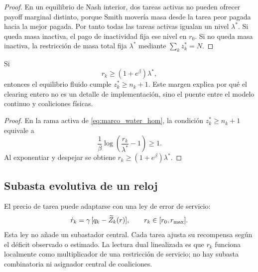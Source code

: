 \begin{proof}
En un equilibrio de Nash interior, dos tareas activas no pueden ofrecer payoff marginal
distinto, porque Smith movería masa desde la tarea peor pagada hacia la mejor pagada.
Por tanto todas las tareas activas igualan un nivel $\lambda^*$. Si queda masa inactiva,
el pago de inactividad fija ese nivel en $r_0$. Si no queda masa inactiva, la restricción
de masa total fija $\lambda^*$ mediante $\sum_k z_k^*=N$.
\end{proof}

\begin{corolario}
Si
\[
  r_k\ge (1+e^\beta)\lambda^*,
\]
entonces el equilibrio fluido cumple $z_k^*\ge n_k+1$. Este margen explica por qué el
clearing entero no es un detalle de implementación, sino el puente entre el modelo
continuo y coaliciones físicas.
\end{corolario}

\begin{proof}
En la rama activa de \eqref{eq:marco_water_hom}, la condición
$z_k^*\ge n_k+1$ equivale a
\[
  \frac{1}{\beta}\log\left(\frac{r_k}{\lambda^*}-1\right)\ge1.
\]
Al exponentiar y despejar se obtiene $r_k\ge(1+e^\beta)\lambda^*$.
\end{proof}

\subsection{Subasta evolutiva de un reloj}

El precio de tarea puede adaptarse con una ley de error de servicio:
\begin{equation}
  \dot r_k=\gamma\,[q_k-\widetilde{Z}_k(r)],
  \qquad r_k\in[r_0,r_{\max}].
  \label{eq:marco_subasta}
\end{equation}
Esta ley no añade un subastador central. Cada tarea ajusta su recompensa según el déficit
observado o estimado. La lectura dual linealizada es que $r_k$ funciona localmente como
multiplicador de una restricción de servicio; no hay subasta combinatoria ni asignador
central de coaliciones.

